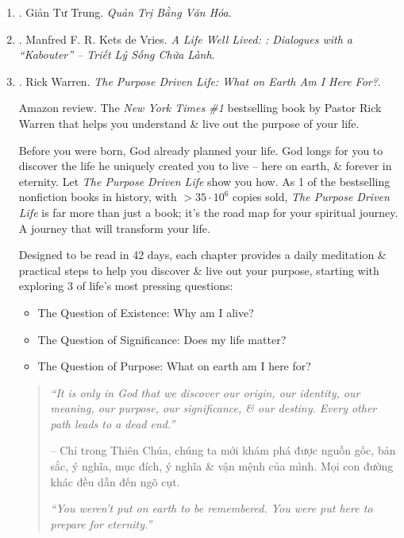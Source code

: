 \documentclass{article}
\begin{document}
\begin{enumerate}
	\item \cite{Trung_van_hoa}. {\sc Giản Tư Trung}. {\it Quản Trị Bằng Văn Hóa}.\hfill{\sf[done]}

    \item \cite{Vries_life_well_lived_VN}. {\sc Manfred F. R. Kets de Vries}. {\it A Life Well Lived: : Dialogues with a ``Kabouter'' -- Triết Lý Sống Chữa Lành}.\hfill{\sf[done]}

	\item \cite{Warren_purpose_driven_life}. {\sc Rick Warren}. {\it The Purpose Driven Life: What on Earth Am I Here For?}. {}

	{\sf Amazon review.} The {\it New York Times \#1} bestselling book by Pastor {\sc Rick Warren} that helps you understand \& live out the purpose of your life.

	Before you were born, God already planned your life. God longs for you to discover the life he uniquely created you to live -- here on earth, \& forever in eternity. Let {\it The Purpose Driven Life} show you how. As 1 of the bestselling nonfiction books in history, with $> 35\cdot10^6$ copies sold, {\it The Purpose Driven Life} is far more than just a book; it's the road map for your spiritual journey. A journey that will transform your life.

	Designed to be read in 42 days, each chapter provides a daily meditation \& practical steps to help you discover \& live out your purpose, starting with exploring 3 of life's most pressing questions:
	\begin{itemize}
		\item The Question of Existence: Why am I alive?
		\item The Question of Significance: Does my life matter?
		\item The Question of Purpose: What on earth am I here for?
	\end{itemize}
	\begin{quotation}
		{\it``It is only in God that we discover our origin, our identity, our meaning, our purpose, our significance, \& our destiny. Every other path leads to a dead end.''}

		-- Chỉ trong Thiên Chúa, chúng ta mới khám phá được nguồn gốc, bản sắc, ý nghĩa, mục đích, ý nghĩa \& vận mệnh của mình. Mọi con đường khác đều dẫn đến ngõ cụt.

		{\it``You weren't put on earth to be remembered. You were put here to prepare for eternity.''}


\end{quotation}
\end{enumerate}
\end{document}
